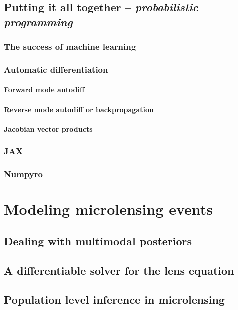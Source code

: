 \documentclass[]{report}
\begin{document}
\section{Putting it all together -- \emph{probabilistic programming}}
\subsection{The success of machine learning}
\subsection{Automatic differentiation}
\subsubsection{Forward mode autodiff}
\subsubsection{Reverse mode autodiff or backpropagation}
\subsubsection{Jacobian vector products}
\subsection{JAX}
\subsection{Numpyro}

\chapter{Modeling microlensing events}
\section{Dealing with multimodal posteriors}
\section{A differentiable solver for the lens equation}
\section{Population level inference in microlensing}
\end{document}
